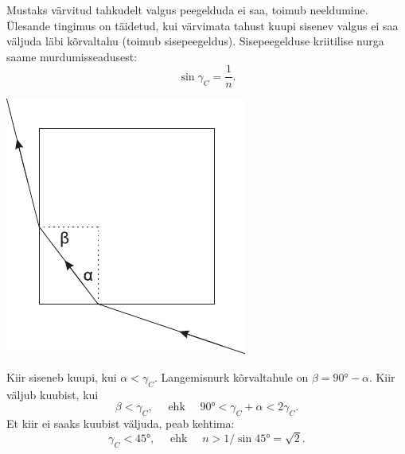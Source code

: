 \documentclass[10pt, twoside]{article}
\begin{document}
{
\solu
Mustaks värvitud tahkudelt valgus peegelduda ei saa, toimub neeldumine. Ülesande tingimus on täidetud, kui värvimata tahust kuupi sisenev valgus ei saa
väljuda läbi kõrvaltahu (toimub sisepeegeldus). Sisepeegelduse kriitilise nurga saame murdumisseadusest:
\[
\sin \gamma_{C}=\frac{1}{n}.
\]

\begin{center}
	\includegraphics[width=0.45\linewidth]{2009-v2g-07-lah}
\end{center}

Kiir siseneb kuupi, kui $\alpha<\gamma_{C}$. Langemisnurk kõrvaltahule on $\beta = \ang{90} - \alpha$. Kiir väljub kuubist, kui
\[
\beta<\gamma_{C}, \quad \text { ehk } \quad \ang{90}<\gamma_{C}+\alpha<2 \gamma_{C}.
\]
Et kiir ei saaks kuubist väljuda, peab kehtima:
\[
\gamma_{C}<\ang{45}, \quad \text { ehk } \quad n>1 / \sin \ang{45}=\sqrt{2}.
\]
\probend
\bigskip


}
\end{document}
